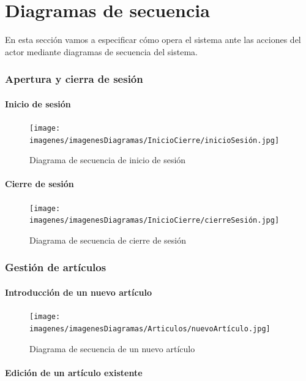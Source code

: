 \chapter{Diagramas de secuencia}
\label{chap:anexo2}

En esta sección vamos a especificar cómo opera el sistema ante las acciones del actor mediante diagramas de secuencia del sistema. 

\subsection{Apertura y cierra de sesión}

\subsubsection{Inicio de sesión}

\begin{figure}[H]
	\centering
	\texttt{[image: imagenes/imagenesDiagramas/InicioCierre/inicioSesión.jpg]}
	\caption{Diagrama de secuencia de inicio de sesión}
	\label{fig:seqdiag1}
\end{figure}

\subsubsection{Cierre de sesión}

\begin{figure}[H]
	\centering
	\texttt{[image: imagenes/imagenesDiagramas/InicioCierre/cierreSesión.jpg]}
	\caption{Diagrama de secuencia de cierre de sesión}
	\label{fig:seqdiag2}
\end{figure}

\subsection{Gestión de artículos}

\subsubsection{Introducción de un nuevo artículo}

\begin{figure}[H]
	\centering
	\texttt{[image: imagenes/imagenesDiagramas/Articulos/nuevoArtículo.jpg]}
	\caption{Diagrama de secuencia de un nuevo artículo}
	\label{fig:seqdiag3}
\end{figure}

\subsubsection{Edición de un artículo existente}

